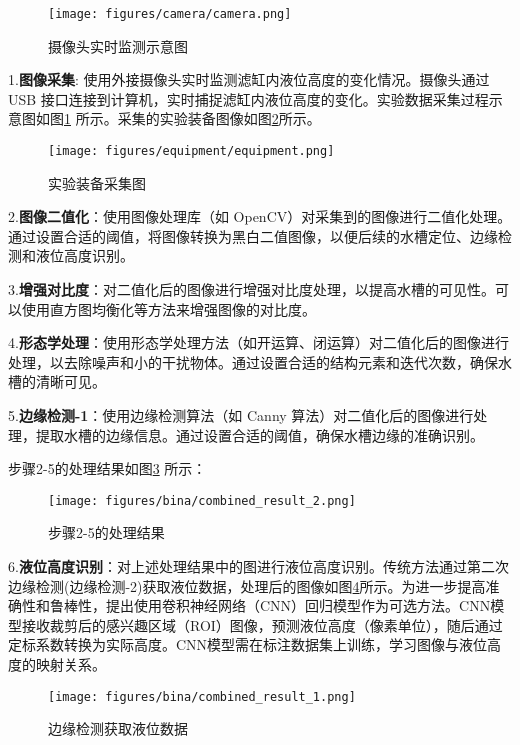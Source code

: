\documentclass[UTF8,a4paper,fontset=none]{ctexart}
\begin{document}
\begin{figure}[H]
    \centering
    \texttt{[image: figures/camera/camera.png]}
    \caption{摄像头实时监测示意图}
    \label{fig:camera}
\end{figure}

1.\textbf{图像采集}: 使用外接摄像头实时监测滤缸内液位高度的变化情况。摄像头通过 USB 接口连接到计算机，实时捕捉滤缸内液位高度的变化。实验数据采集过程示意图如图\ref{fig:camera} 所示。采集的实验装备图像如图\ref{fig:equipment}所示。

\begin{figure}[H]
    \centering
    \texttt{[image: figures/equipment/equipment.png]}
    \caption{实验装备采集图}
    \label{fig:equipment}
\end{figure}

2.\textbf{图像二值化}：使用图像处理库（如 OpenCV）对采集到的图像进行二值化处理。通过设置合适的阈值，将图像转换为黑白二值图像，以便后续的水槽定位、边缘检测和液位高度识别\textsuperscript{\cite{ref13}}。

3.\textbf{增强对比度}：对二值化后的图像进行增强对比度处理\textsuperscript{\cite{ref14}}，以提高水槽的可见性。可以使用直方图均衡化等方法来增强图像的对比度。

4.\textbf{形态学处理}：使用形态学处理方法（如开运算、闭运算）对二值化后的图像进行处理，以去除噪声和小的干扰物体。通过设置合适的结构元素和迭代次数，确保水槽的清晰可见。

5.\textbf{边缘检测-1}：使用边缘检测算法（如 Canny 算法）对二值化后的图像进行处理，提取水槽的边缘信息。通过设置合适的阈值，确保水槽边缘的准确识别。

步骤2-5的处理结果如图\ref{fig:combined_result_2.png} 所示：

\begin{figure}[H]
    \centering
    \texttt{[image: figures/bina/combined\_result\_2.png]}
    \caption{步骤2-5的处理结果}
    \label{fig:combined_result_2.png}
\end{figure}

6.\textbf{液位高度识别}：对上述处理结果中的图进行液位高度识别。传统方法通过第二次边缘检测(边缘检测-2)获取液位数据，处理后的图像如图\ref{fig:combined_result_1.png}所示。为进一步提高准确性和鲁棒性，提出使用卷积神经网络（CNN）回归模型作为可选方法。CNN模型接收裁剪后的感兴趣区域（ROI）图像，预测液位高度（像素单位），随后通过定标系数转换为实际高度。CNN模型需在标注数据集上训练，学习图像与液位高度的映射关系。

\begin{figure}[H]
    \centering
    \texttt{[image: figures/bina/combined\_result\_1.png]}
    \caption{边缘检测获取液位数据}
    \label{fig:combined_result_1.png}
\end{figure}
\end{document}
